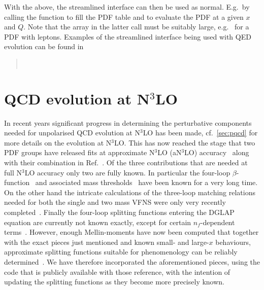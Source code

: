 With the above, the streamlined interface can then be used as normal.
%
E.g.\ by calling the  function to fill the PDF
table and  to evaluate the PDF at a given $x$
and $Q$.
%
Note that the  array in the latter call must be
suitably large, e.g.\  for a PDF with leptons.
%
Examples of the streamlined interface being used with QED evolution
can be found in
\begin{quote}
  \\
\end{quote}

\section{QCD evolution at N$^3$LO}
\label{sec:n3lo-evolution}
In recent years significant progress in determining the perturbative
components needed for unpolarised QCD evolution at N$^3$LO has been
made, cf.\ \ref{sec:pqcd} for more details on the evolution at N$^3$LO.
%
This has now reached the stage that two PDF groups have released fits
at approximate N$^3$LO (aN$^3$LO)
accuracy~\cite{McGowan:2022nag,NNPDF:2024nan} along with their
combination in Ref.~\cite{Cridge:2024icl}.
%
Of the three contributions that are needed at full N$^3$LO accuracy
only two are fully known.
%
In particular the four-loop
$\beta$-function~\cite{vanRitbergen:1997va,Czakon:2004bu} and
associated mass thresholds~\cite{Chetyrkin:1997sg} have been known for
a very long time.
%
On the other hand the intricate calculations of the three-loop
matching relations needed for both the single and two mass VFNS were
only very recently
completed~\cite{Bierenbaum:2009mv,Ablinger:2010ty,Kawamura:2012cr,Blumlein:2012vq,ABLINGER2014263,Ablinger:2014nga,Ablinger:2014vwa,Behring:2014eya,Ablinger:2019etw,Behring:2021asx,Ablinger:2023ahe,Ablinger:2024xtt}.
%
Finally the four-loop splitting functions entering the DGLAP equation
are currently not known exactly, except for certain $n_f$-dependent
terms~\cite{Gracey:1994nn,Davies:2016jie,Moch:2017uml,Gehrmann:2023cqm,Falcioni:2023tzp,Gehrmann:2023iah}.
%
However, enough Mellin-moments have now been computed that together
with the exact pieces just mentioned and known small- and large-$x$
behaviours, approximate splitting functions suitable for phenomenology
can be reliably
determined~\cite{McGowan:2022nag,NNPDF:2024nan,Moch:2021qrk,Falcioni:2023luc,Falcioni:2023vqq,Moch:2023tdj,Falcioni:2024xyt,Falcioni:2024qpd}.
%
We have therefore incorporated the aforementioned pieces, using the
code that is publicly available with those reference, with the
intention of updating the splitting functions as they become more
precisely known. 

